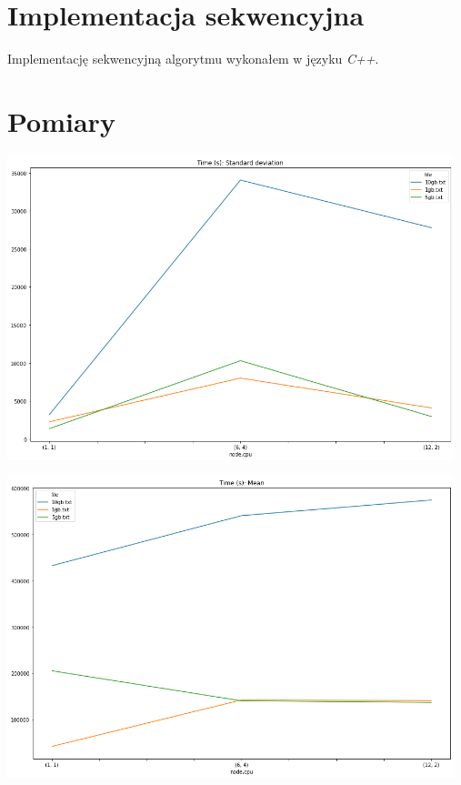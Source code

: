 \documentclass{article}
\begin{document}
    \section{Implementacja sekwencyjna}
    Implementację sekwencyjną algorytmu wykonałem w języku \textit{C++}.
    
    
    \section{Pomiary}
    
        \begin{center}
            \includegraphics[width=13cm]{ex4/report/time_std.png}
        \end{center}
        \begin{center}
            \includegraphics[width=13cm]{ex4/report/time_mean.png}
        \end{center}
\end{document}
